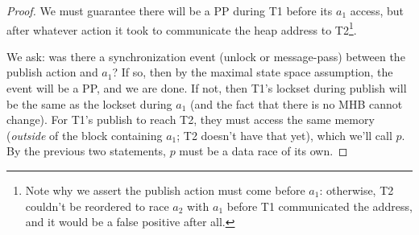 \begin{proof}
We must guarantee there will be a PP during T1 before its $a_1$ access, but after whatever action it took to communicate the heap address to T2\footnote{
Note why we assert the publish action must come before $a_1$: otherwise, T2 couldn't be reordered to race $a_2$ with $a_1$ before T1 communicated the address, and it would be a false positive after all.}.


We ask: was there a synchronization event (unlock or message-pass) between the publish action and $a_1$?
If so, then by the maximal state space assumption, the event will be a PP, and we are done.
If not, then  T1's lockset during publish will be the same as the lockset during $a_1$ (and the fact that there is no MHB cannot change).
For T1's publish to reach T2, they must access the same memory ({\em outside} of the block containing $a_1$; T2 doesn't have that yet),
which we'll call $p$.
By the previous two statements, $p$ must be a data race of its own.


\end{proof}
